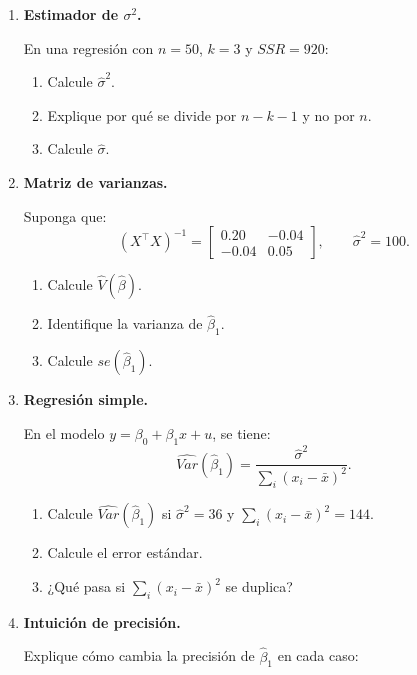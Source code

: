 \documentclass[11pt]{article}
\begin{document}
\begin{enumerate}[label=\textbf{Ejercicio \arabic*.}, leftmargin=*]

\item \textbf{Estimador de \(\sigma^2\).}

En una regresión con \(n=50\), \(k=3\) y \(SSR=920\):

\begin{enumerate}[label=\alph*)]
    \item Calcule \(\hat{\sigma}^2\).
    \item Explique por qué se divide por \(n-k-1\) y no por \(n\).
    \item Calcule \(\hat{\sigma}\).
\end{enumerate}

\item \textbf{Matriz de varianzas.}

Suponga que:
\[
(X^\top X)^{-1}=
\begin{bmatrix}
0.20 & -0.04\\
-0.04 & 0.05
\end{bmatrix},
\qquad
\hat{\sigma}^2=100.
\]

\begin{enumerate}[label=\alph*)]
    \item Calcule \(\hat{V}(\hat{\beta})\).
    \item Identifique la varianza de \(\hat{\beta}_1\).
    \item Calcule \(se(\hat{\beta}_1)\).
\end{enumerate}

\item \textbf{Regresión simple.}

En el modelo \(y=\beta_0+\beta_1x+u\), se tiene:
\[
\widehat{Var}(\hat{\beta}_1)=\frac{\hat{\sigma}^2}{\sum_i(x_i-\bar{x})^2}.
\]

\begin{enumerate}[label=\alph*)]
    \item Calcule \(\widehat{Var}(\hat{\beta}_1)\) si \(\hat{\sigma}^2=36\) y \(\sum_i(x_i-\bar{x})^2=144\).
    \item Calcule el error estándar.
    \item ¿Qué pasa si \(\sum_i(x_i-\bar{x})^2\) se duplica?
\end{enumerate}

\item \textbf{Intuición de precisión.}

Explique cómo cambia la precisión de \(\hat{\beta}_1\) en cada caso:


\end{enumerate}
\end{document}
